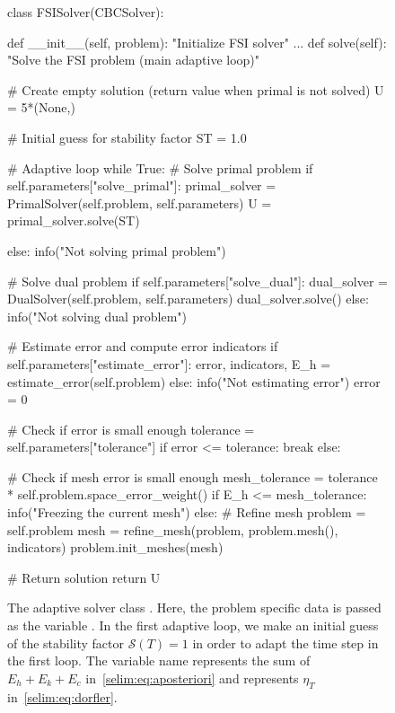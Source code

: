 \begin{figure}
\label{selim:fig:FSISolver}
\caption{The adaptive solver class . Here, the
  problem specific data is passed as the variable . In
  the first adaptive loop, we make an initial guess of the stability
  factor $\mathcal{S}(T)=1$ in order to adapt the time step in the
  first loop.  The variable name  represents the sum of
  $E_h + E_k + E_c$ in~\eqref{selim:eq:aposteriori} and
   represents $\eta_T$ in~\eqref{selim:eq:dorfler}.}
\begin{python}
class FSISolver(CBCSolver):

    def __init__(self, problem):
        "Initialize FSI solver"
            ...
    def solve(self):
        "Solve the FSI problem (main adaptive loop)"

        # Create empty solution (return value when primal is not solved)
        U = 5*(None,)

        # Initial guess for stability factor
        ST = 1.0

        # Adaptive loop
        while True:
            # Solve primal problem
            if self.parameters["solve_primal"]:
                primal_solver = PrimalSolver(self.problem, self.parameters)
                U = primal_solver.solve(ST)

            else:
                info("Not solving primal problem")

            # Solve dual problem
            if self.parameters["solve_dual"]:
                dual_solver = DualSolver(self.problem, self.parameters)
                dual_solver.solve()
            else:
                info("Not solving dual problem")

            # Estimate error and compute error indicators
            if self.parameters["estimate_error"]:
                error, indicators, E_h = estimate_error(self.problem)
            else:
                info("Not estimating error")
                error = 0

            # Check if error is small enough
            tolerance = self.parameters["tolerance"]
            if error <= tolerance:
                break
            else:

            # Check if mesh error is small enough
            mesh_tolerance = tolerance * self.problem.space_error_weight()
            if E_h <= mesh_tolerance:
                info("Freezing the current mesh")
            else:
                # Refine mesh
                problem = self.problem
                mesh = refine_mesh(problem,
                                   problem.mesh(),
                                   indicators)
                problem.init_meshes(mesh)

        # Return solution
        return U
\end{python}
\end{figure}


